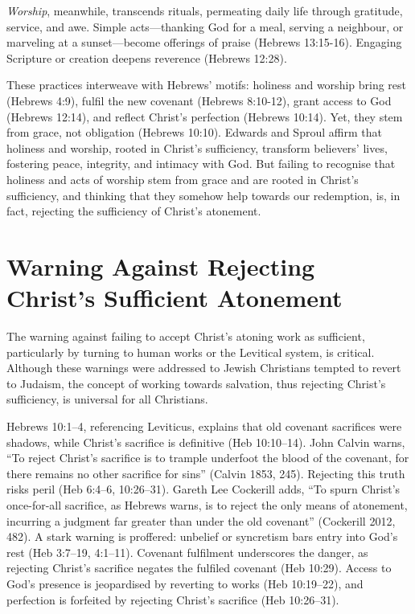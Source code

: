 \documentclass[12pt]{article}
\begin{document}
\emph{Worship}, meanwhile, transcends rituals, permeating daily life through
gratitude, service, and awe. Simple acts—thanking God for a meal, serving a
neighbour, or marveling at a sunset—become offerings of praise (Hebrews
13:15-16). Engaging Scripture or creation deepens reverence (Hebrews 12:28).

These practices interweave with Hebrews’ motifs: holiness and worship bring rest
(Hebrews 4:9), fulfil the new covenant (Hebrews 8:10-12), grant access to God
(Hebrews 12:14), and reflect Christ’s perfection (Hebrews 10:14). Yet, they stem
from grace, not obligation (Hebrews 10:10). Edwards and Sproul affirm that
holiness and worship, rooted in Christ’s sufficiency, transform believers’
lives, fostering peace, integrity, and intimacy with God. But failing to
recognise that holiness and acts of worship stem from grace and are rooted in
Christ’s sufficiency, and thinking that they somehow help towards our
redemption, is, in fact, rejecting the sufficiency of Christ's atonement.

\section{Warning Against Rejecting Christ’s Sufficient Atonement}
The warning against failing to accept Christ’s atoning work as sufficient,
particularly by turning to human works or the Levitical system, is critical.
Although these warnings were addressed to Jewish Christians tempted to revert to
Judaism, the concept of working towards salvation, thus rejecting Christ’s
sufficiency, is universal for all Christians.

Hebrews 10:1--4, referencing Leviticus, explains that old covenant sacrifices
were shadows, while Christ’s sacrifice is definitive (Heb 10:10--14). John
Calvin warns, ``To reject Christ’s sacrifice is to trample underfoot the blood
of the covenant, for there remains no other sacrifice for sins'' (Calvin 1853,
245). Rejecting this truth risks peril (Heb 6:4--6, 10:26--31). Gareth Lee
Cockerill adds, ``To spurn Christ’s once-for-all sacrifice, as Hebrews warns,
is to reject the only means of atonement, incurring a judgment far greater than
under the old covenant'' (Cockerill 2012, 482). A stark warning is proffered:
unbelief or syncretism bars entry into God’s rest (Heb 3:7--19, 4:1--11).
Covenant fulfilment underscores the danger, as rejecting Christ’s sacrifice
negates the fulfiled covenant (Heb 10:29). Access to God’s presence is
jeopardised by reverting to works (Heb 10:19--22), and perfection is forfeited
by rejecting Christ’s sacrifice (Heb 10:26--31).
\end{document}
